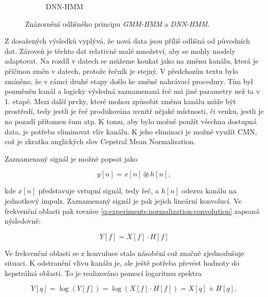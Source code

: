 \begin{figure}[htpb]
\begin{subfigure}[b]{0.4\textwidth}
    \caption{DNN-HMM}
    \label{fig:experiments:normalization:hmm:dnn}
  \end{subfigure}
  \caption{Znázornění odlišného principu \textit{GMM-HMM} a \textit{DNN-HMM}.}
  \label{fig:experiments:normalization:hmm}
\end{figure}



Z dosažených výsledků vyplývá, že nová data jsou příliš odlišná od původních dat. Zároveň je těchto dat relativně malé množství, aby se mohly modely adaptovat. Na rozdíl v datech se můžeme koukat jako na změnu kanálu, která je příčinou změn v datech, protože řečník je stejný. V předchozím textu bylo zmíněno, že v rámci druhé etapy došlo ke změné nahrávací procedury. Tím byl pozměněn kanál a logicky výsledná zaznamenaná řeč má jiné parametry než ta v 1. etapě. Mezi další prvky, které mohou způsobit změnu kanálu může být prostředí, tedy jestli je řeč produkována uvnitř nějaké místnosti, či venku, jestli je na pozadí přítomen šum atp. K tomu, aby bylo možné použít všechna dostupná data, je potřeba eliminovat vliv kanálu. K jeho eliminaci je možné využít CMN, což je zkratka anglických slov Cepstral Mean Normalisation.

Zaznamenaný signál je možné popsat jako

\begin{equation}
  y\left[n\right] = x\left[n\right] \circledast h\left[n\right],
  \label{eq:experiments:normalization:convolution}
\end{equation}

\noindent kde $x\left[n\right]$ představuje vstupní signál, tedy řeč, a $h\left[n\right]$ odezva kanálu na jednotkový impulz. Zaznamenaný signál je pak jejich lineární konvolucí. Ve frekvenční oblasti pak rovnice \ref{q:experiments:normalization:convolution} zapsaná nýsledovně:

\begin{equation}
  Y\left[f\right] = X\left[f\right] \cdot H\left[f\right]
\end{equation}

\noindent Ve frekvenční oblasti se z konvuluce stalo násobění což značně zjednodušuje situaci. K odstranění vlivu kanálu je, ale ještě potřeba převést hodnoty do kepstrálná oblasti. To je realizováno pomocí logaritmu spektra

\begin{equation}
  Y\left[q\right] = \log\left(Y\left[f\right]\right) = \log\left(X\left[f\right] \cdot H\left[f\right]\right) = X\left[q\right] + H\left[q\right],
\end{equation}

